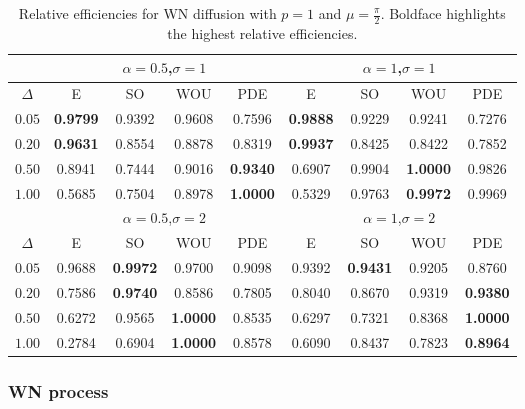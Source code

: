 \documentclass[oneside,11pt]{article}
\begin{document}
\begin{table}[H]
\centering
\small
\begin{tabular}{c|cccc||cccc}
\toprule\toprule
& \multicolumn{4}{c||}{$\alpha=0.5$,\quad $\sigma=1$} & \multicolumn{4}{c}{$\alpha=1$,\quad $\sigma=1$} \\ \midrule
$\Delta$ &     E     &    SO     &    WOU    &      PDE      &     E     &    SO     &    WOU    &     PDE     \\ \midrule
$0.05$ & \bf  0.9799 &  0.9392 &  0.9608 &  0.7596 & \bf  0.9888 &  0.9229 &  0.9241 &  0.7276\\
$0.20$ & \bf  0.9631 &  0.8554 &  0.8878 &  0.8319 & \bf  0.9937 &  0.8425 &  0.8422 &  0.7852\\
$0.50$ &  0.8941 &  0.7444 &  0.9016 & \bf  0.9340 &  0.6907 &  0.9904 & \bf  1.0000 &  0.9826\\
$1.00$ &  0.5685 &  0.7504 &  0.8978 & \bf  1.0000 &  0.5329 &  0.9763 & \bf  0.9972 &  0.9969\\ \midrule\midrule
& \multicolumn{4}{c||}{$\alpha=0.5$,\quad $\sigma=2$} & \multicolumn{4}{c}{$\alpha=1$,\quad $\sigma=2$} \\ \midrule
$\Delta$ &     E     &    SO     &    WOU    &      PDE      &     E     &    SO     &    WOU    &     PDE     \\ \midrule
$0.05$ &  0.9688 & \bf  0.9972 &  0.9700 &  0.9098 &  0.9392 & \bf  0.9431 &  0.9205 &  0.8760\\
$0.20$ &  0.7586 & \bf  0.9740 &  0.8586 &  0.7805 &  0.8040 &  0.8670 &  0.9319 & \bf  0.9380\\
$0.50$ &  0.6272 &  0.9565 & \bf  1.0000 &  0.8535 &  0.6297 &  0.7321 &  0.8368 & \bf  1.0000\\
$1.00$ &  0.2784 &  0.6904 & \bf  1.0000 &  0.8578 &  0.6090 &  0.8437 &  0.7823 & \bf  0.8964\\ \bottomrule\bottomrule
\end{tabular}
\caption{\small Relative efficiencies for WN diffusion with $p=1$ and $\mu=\tfrac{\pi}{2}$. Boldface highlights the highest relative efficiencies. \label{tab:wn1}}
\end{table}

\subsubsection{WN process}
\end{document}
